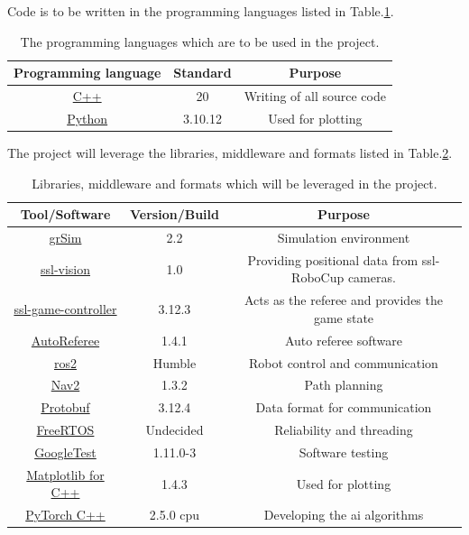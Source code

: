 Code is to be written in the programming languages listed in Table.\:\ref{tab:programming_languages}.
\begin{table}[H]
    \centering
    \caption{The programming languages which are to be used in the project.}
    \label{tab:programming_languages}
    \begin{tabular}{|c|c|c|} \hline
         \textbf{Programming language} & \textbf{Standard} & \textbf{Purpose} \\ \hline
         \href{https://en.cppreference.com/w/cpp/20}{C++} & 20 & Writing of all source code \\ \hline
         \href{https://www.python.org/downloads/release/python-31012/}{Python} & 3.10.12 & Used for plotting \\ \hline
    \end{tabular}
\end{table}

The project will leverage the libraries, middleware and formats listed in Table.\:\ref{tab:libraries_middleware_formats}.
\begin{table}[H]
    \centering
    \caption{Libraries, middleware and formats which will be leveraged in the project.}
    \label{tab:libraries_middleware_formats}
    \begin{tabular}{|c|c|c|} \hline
         \textbf{Tool/Software} & \textbf{Version/Build} & \textbf{Purpose} \\ \hline
         \href{https://github.com/RoboCup-SSL/grSim}{grSim} & 2.2 & Simulation environment \\ \hline
         \href{https://github.com/RoboCup-SSL/ssl-vision}{ssl-vision} & 1.0 & Providing positional data from \ac{ssl}-RoboCup cameras. \\ \hline
         \href{https://github.com/RoboCup-SSL/ssl-game-controller}{ssl-game-controller} & 3.12.3 & Acts as the referee and provides the game state \\ \hline
         \href{https://github.com/TIGERs-Mannheim/AutoReferee}{AutoReferee} & 1.4.1 & Auto referee software \\ \hline
         \href{https://docs.ros.org/en/humble/index.html}{\ac{ros2}} & Humble & Robot control and communication \\ \hline
         \href{https://docs.nav2.org/index.html}{Nav2} & 1.3.2 & Path planning \\ \hline
         \href{https://github.com/protocolbuffers/protobuf}{Protobuf} & 3.12.4 & Data format for communication \\ \hline
         \href{https://freertos.org/}{FreeRTOS} & Undecided & Reliability and threading \\ \hline
         \href{https://google.github.io/googletest/}{GoogleTest} & 1.11.0-3 & Software testing \\ \hline
         \href{https://matplotlib-cpp.readthedocs.io/en/latest/}{Matplotlib for C++} & 1.4.3 & Used for plotting \\ \hline
         \href{https://pytorch.org/cppdocs/}{PyTorch C++} & 2.5.0 \acs{cpu} & Developing the \acs{ai} algorithms \\ \hline
    \end{tabular}
\end{table}


